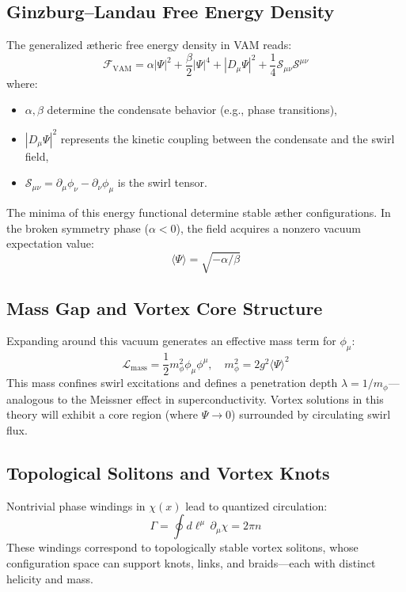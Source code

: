         \subsection{Ginzburg--Landau Free Energy Density}
        The generalized ætheric free energy density in VAM reads:
        \begin{equation}
            \mathcal{F}_{\text{VAM}} = \alpha |\Psi|^2 + \frac{\beta}{2} |\Psi|^4 + |D_\mu \Psi|^2 + \frac{1}{4} \mathcal{S}_{\mu\nu} \mathcal{S}^{\mu\nu}
        \end{equation}
        where:
        \begin{itemize}
            \item $\alpha, \beta$ determine the condensate behavior (e.g., phase transitions),
            \item $|D_\mu \Psi|^2$ represents the kinetic coupling between the condensate and the swirl field,
            \item $\mathcal{S}_{\mu\nu} = \partial_\mu \phi_\nu - \partial_\nu \phi_\mu$ is the swirl tensor.
        \end{itemize}

        The minima of this energy functional determine stable æther configurations. In the broken symmetry phase ($\alpha < 0$), the field acquires a nonzero vacuum expectation value:
        \begin{equation}
            \langle \Psi \rangle = \sqrt{-\alpha/\beta}
        \end{equation}

        \subsection{Mass Gap and Vortex Core Structure}
        Expanding around this vacuum generates an effective mass term for $\phi_\mu$:
        \begin{equation}
            \mathcal{L}_{\text{mass}} = \frac{1}{2} m_\phi^2 \phi_\mu \phi^\mu, \quad m_\phi^2 = 2 g^2 \langle \Psi \rangle^2
        \end{equation}
        This mass confines swirl excitations and defines a penetration depth $\lambda = 1/m_\phi$---analogous to the Meissner effect in superconductivity. Vortex solutions in this theory will exhibit a core region (where $\Psi \rightarrow 0$) surrounded by circulating swirl flux.

        \subsection{Topological Solitons and Vortex Knots}
        Nontrivial phase windings in $\chi(x)$ lead to quantized circulation:
        \begin{equation}
            \Gamma = \oint d\ell^\mu \, \partial_\mu \chi = 2\pi n
        \end{equation}
        These windings correspond to topologically stable vortex solitons, whose configuration space can support knots, links, and braids---each with distinct helicity and mass.


